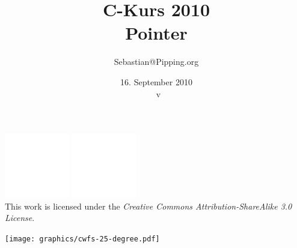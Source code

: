 \documentclass{beamer}
\title{C-Kurs 2010\\Pointer}
\author{Sebastian@Pipping.org}
\date{16. September 2010\\{\tiny~v\vspace*{-5ex}}}
\newcommand{\CcLongnameBySa}{Attribution-ShareAlike}
\newcommand{\CcImageBy}[1]{%
	\includegraphics[scale=#1]{creative-commons/cc-by-white.pdf}%
}
\newcommand{\CcImageSa}[1]{%
	\includegraphics[scale=#1]{creative-commons/cc-sa-white.pdf}%
}
\newcommand{\CcNote}[1]{%
	This work is licensed under the \textit{Creative Commons #1 3.0 License}.%
}
\newcommand{\CcGroupBySa}[2]{%
	\CcImageBy{#1}\hspace*{#2}\CcImageSa{#1}%
}
\begin{document}

\begin{frame}
	\titlepage
	\vfill
	\begin{center}
		\CcGroupBySa{0.33}{0.95ex}\\[2.5ex]
		{\tiny\CcNote{\CcLongnameBySa}}
		\vspace*{13ex}
	\end{center}
	\vspace*{-5ex}
	\vspace*{-0.5\textheight}\hspace*{0.65\textwidth}\texttt{[image: graphics/cwfs-25-degree.pdf]}
\end{frame}


\end{document}
